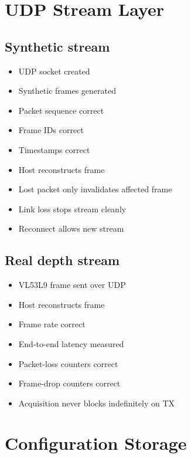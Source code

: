 \documentclass[10pt,a4paper,oneside]{report}
\providecommand{\tightlist}{\setlength{\itemsep}{1pt}\setlength{\parskip}{1pt}}
\begin{document}
\section{UDP Stream Layer}\label{wiki-hardware-bring-up-and-testing--17-udp-stream-layer}

\subsection{Synthetic stream}\label{wiki-hardware-bring-up-and-testing--171-synthetic-stream}

\begin{itemize}
\tightlist
\item[$\square$]
  UDP socket created
\item[$\square$]
  Synthetic frames generated
\item[$\square$]
  Packet sequence correct
\item[$\square$]
  Frame IDs correct
\item[$\square$]
  Timestamps correct
\item[$\square$]
  Host reconstructs frame
\item[$\square$]
  Lost packet only invalidates affected frame
\item[$\square$]
  Link loss stops stream cleanly
\item[$\square$]
  Reconnect allows new stream
\end{itemize}

\subsection{Real depth stream}\label{wiki-hardware-bring-up-and-testing--172-real-depth-stream}

\begin{itemize}
\tightlist
\item[$\square$]
  VL53L9 frame sent over UDP
\item[$\square$]
  Host reconstructs frame
\item[$\square$]
  Frame rate correct
\item[$\square$]
  End-to-end latency measured
\item[$\square$]
  Packet-loss counters correct
\item[$\square$]
  Frame-drop counters correct
\item[$\square$]
  Acquisition never blocks indefinitely on TX
\end{itemize}

\section{Configuration Storage}\label{wiki-hardware-bring-up-and-testing--18-configuration-storage}
\end{document}
